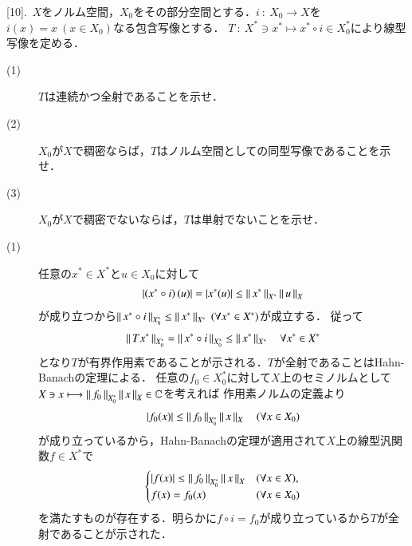[10].\ $X$をノルム空間，$X_0$をその部分空間とする．$i\ :\ X_0 \rightarrow X$を$i(x) = x\ (x \in X_0)$なる包含写像とする．
$T\ :\ X^* \ni x^* \longmapsto x^* \circ i \in X_0^*$により線型写像を定める．
\begin{description}
	\item[(1)] $T$は連続かつ全射であることを示せ．
	\item[(2)] $X_0$が$X$で稠密ならば，$T$はノルム空間としての同型写像であることを示せ．
	\item[(3)] $X_0$が$X$で稠密でないならば，$T$は単射でないことを示せ．
\end{description}

\begin{prf}
\begin{description}
	\item[(1)] 任意の$x^* \in X^*$と$u \in X_0$に対して
		\begin{align}
			\left|\left( x^* \circ i \right) (u)\right| = \left| x^*(u) \right| \leq \left\|\, x^*\, \right\|_{X^*} \left\|\, u\, \right\|_{X}
		\end{align}
		が成り立つから$\Norm{x^* \circ i}{X_0^*} \leq \Norm{x^*}{X^*}\ (\forall x^* \in X^*)$が成立する．
		従って
		\begin{align}
			\left\|\, Tx^*\, \right\|_{X_0^*} = \left\|\, x^* \circ i\, \right\|_{X_0^*} \leq \left\|\, x^*\, \right\|_{X^*} \quad \forall x^* \in X^*
		\end{align}
		となり$T$が有界作用素であることが示される．$T$が全射であることはHahn-Banachの定理による．
		任意の$f_0 \in X_0^*$に対して$X$上のセミノルムとして$X \ni x \longmapsto \left\|\, f_0\, \right\|_{X_0^*}\left\|\, x\, \right\|_{X} \in \mathbb{C}$を考えれば
		作用素ノルムの定義より
		\begin{align}
			|f_0 (x)| \leq  \left\|\, f_0\, \right\|_{X_0^*}\left\|\, x\, \right\|_{X}\quad (\forall x \in X_0)
		\end{align}
		が成り立っているから，Hahn-Banachの定理が適用されて$X$上の線型汎関数$f \in X^*$で
		\begin{align}
			\begin{cases}
				|f (x)| \leq  \left\|\, f_0\, \right\|_{X_0^*}\left\|\, x\, \right\|_{X} & (\forall x \in X), \\
				f(x) = f_0(x) & (\forall x \in X_0)
			\end{cases}
		\end{align}
		を満たすものが存在する．明らかに$f \circ i = f_0$が成り立っているから$T$が全射であることが示された．
	

\end{description}
\end{prf}
